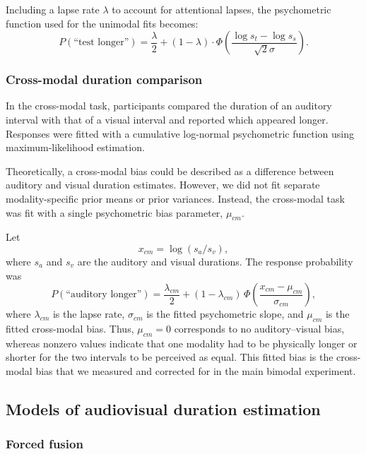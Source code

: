 \documentclass[9pt,lineno,doublespacing]{elife}
\begin{document}
Including a lapse rate $\lambda$ to account for attentional lapses, the psychometric function used for the unimodal fits becomes:
\begin{equation}
P(\text{``test longer''}) = \frac{\lambda}{2} + (1-\lambda) \cdot \Phi\left( \frac{\log s_t - \log s_s}{\sqrt{2}\sigma} \right).
\end{equation}


\subsubsection{Cross-modal duration comparison}

In the cross-modal task, participants compared the duration of an auditory interval with that of a visual interval and reported which appeared longer. Responses were fitted with a cumulative log-normal psychometric function using maximum-likelihood estimation.

Theoretically, a cross-modal bias could be described as a difference between auditory and visual duration estimates. However, we did not fit separate modality-specific prior means or prior variances. Instead, the cross-modal task was fit with a single psychometric bias parameter, $\mu_{cm}$.

Let
\begin{equation}
x_{cm} = \log(s_a/s_v),
\end{equation}
where $s_a$ and $s_v$ are the auditory and visual durations. The response probability was
\begin{equation}
P(\text{``auditory longer''})
=
\frac{\lambda_{cm}}{2}
+ (1-\lambda_{cm})\,
\Phi\left(
\frac{x_{cm}-\mu_{cm}}{\sigma_{cm}}
\right),
\end{equation}
where $\lambda_{cm}$ is the lapse rate, $\sigma_{cm}$ is the fitted psychometric slope, and $\mu_{cm}$ is the fitted cross-modal bias. Thus, $\mu_{cm}=0$ corresponds to no auditory--visual bias, whereas nonzero values indicate that one modality had to be physically longer or shorter for the two intervals to be perceived as equal. This fitted bias is the cross-modal bias that we measured and corrected for in the main bimodal experiment.

\subsection{Models of audiovisual duration estimation}




\subsubsection{Forced fusion}\label{mandatoryFusion}
\end{document}
